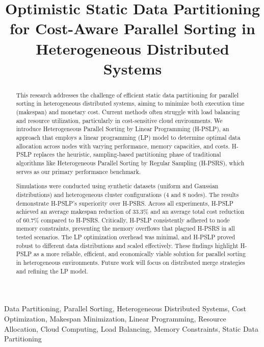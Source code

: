 \documentclass[]{interact}
\theoremstyle{plain}
\theoremstyle{definition}
\theoremstyle{remark}
\begin{document}

\title{Optimistic Static Data Partitioning for Cost-Aware Parallel Sorting in Heterogeneous Distributed Systems}

\author{
}

\maketitle

\begin{abstract}
This research addresses the challenge of efficient static data partitioning for parallel sorting in heterogeneous distributed systems, aiming to minimize both execution time (makespan) and monetary cost. Current methods often struggle with load balancing and resource utilization, particularly in cost-sensitive cloud environments. We introduce Heterogeneous Parallel Sorting by Linear Programming (H-PSLP), an approach that employs a linear programming (LP) model to determine optimal data allocation across nodes with varying performance, memory capacities, and costs. H-PSLP replaces the heuristic, sampling-based partitioning phase of traditional algorithms like Heterogeneous Parallel Sorting by Regular Sampling (H-PSRS), which serves as our primary performance benchmark.

Simulations were conducted using synthetic datasets (uniform and Gaussian distributions) and heterogeneous cluster configurations (4 and 8 nodes). The results demonstrate H-PSLP's superiority over H-PSRS. Across all experiments, H-PSLP achieved an average makespan reduction of 33.3\% and an average total cost reduction of 60.7\% compared to H-PSRS. Critically, H-PSLP consistently adhered to node memory constraints, preventing the memory overflows that plagued H-PSRS in all tested scenarios. The LP optimization overhead was minimal, and H-PSLP proved robust to different data distributions and scaled effectively. These findings highlight H-PSLP as a more reliable, efficient, and economically viable solution for parallel sorting in heterogeneous environments. Future work will focus on distributed merge strategies and refining the LP model.
\end{abstract}

\begin{keywords}
Data Partitioning, Parallel Sorting, Heterogeneous Distributed Systems, Cost Optimization, Makespan Minimization, Linear Programming, Resource Allocation, Cloud Computing, Load Balancing, Memory Constraints, Static Data Partitioning
\end{keywords}
\end{document}
